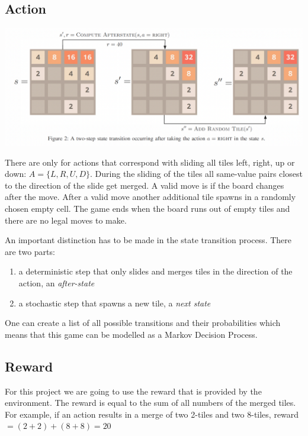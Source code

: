 \documentclass[letterpaper]{article} %
\begin{document}
\subsection{Action}

\begin{center}
    \includegraphics[scale=.25]{images/afterstate.png}
\end{center}

There are only for actions that correspond with sliding all tiles left, right, up or down: $A=\{L, R, U, D\}$. During the sliding of the tiles all same-value pairs closest to the direction of the slide get merged. A valid move is if the board changes after the move. After a valid move another additional tile spawns in a randomly chosen empty cell. The game ends when the board runs out of empty tiles and there are no legal moves to make.

An important distinction has to be made in the state transition process. There are two parts:
\begin{enumerate}
    \item a deterministic step that only slides and merges tiles in the direction of the action, an \textit{after-state} 
    \item a stochastic step that spawns a new tile, a \textit{next state}
\end{enumerate}
One can create a list of all possible transitions and their probabilities which means that this game can be modelled as a Markov Decision Process.


\subsection{Reward}

For this project we are going to use the reward that is provided by the environment. The reward is equal to the sum of all numbers of the merged tiles. For example, if an action results in a merge of two 2-tiles and two 8-tiles, reward $=(2 + 2) + (8 + 8) = 20$
\end{document}
